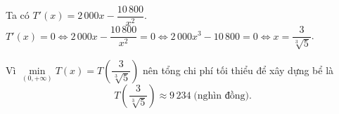 \begin{ex}
{\begin{itemchoice}
			Ta có $T'(x)=2 \, 000x-\dfrac{10 \, 800}{x^2}$.\\
			$T'(x) = 0 \Leftrightarrow 2 \, 000x-\dfrac{10 \, 800}{x^2} = 0 \Leftrightarrow 2\,000x^3 - {10 \, 800}=0 \Leftrightarrow x = \dfrac{3}{\sqrt[3]{5}}$. 
			\begin{center}
			\end{center}
			Vì $\min \limits_{(0,+\infty)} T(x)=T\left(\dfrac{3}{\sqrt[3]{5}}\right)$ nên
			tổng chi phí tối thiểu để xây dựng bể là $$T \left(\dfrac{3}{\sqrt[3]{5}}\right) \approx 9\,234 \; \text{(nghìn đồng)}.$$
		\end{itemchoice}
	}
\end{ex}


